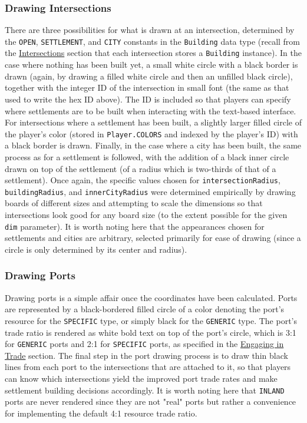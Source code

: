 \documentclass[pageno]{jpaper}
\begin{document}
\begin{doublespacing}
\hypertarget{sec:drawing_intersections}{}
\subsubsection{Drawing Intersections}

There are three possibilities for what is drawn at an intersection, determined by the \lstinline$OPEN$, \lstinline$SETTLEMENT$, and \lstinline$CITY$ constants in the \lstinline$Building$ data type (recall from the \hyperlink{sec:intersections}{Intersections} section that each intersection stores a \lstinline$Building$ instance). In the case where nothing has been built yet, a small white circle with a black border is drawn (again, by drawing a filled white circle and then an unfilled black circle), together with the integer ID of the intersection in small font (the same as that used to write the hex ID above). The ID is included so that players can specify where settlements are to be built when interacting with the text-based interface. For intersections where a settlement has been built, a slightly larger filled circle of the player's color (stored in \lstinline$Player.COLORS$ and indexed by the player's ID) with a black border is drawn. Finally, in the case where a city has been built, the same process as for a settlement is followed, with the addition of a black inner circle drawn on top of the settlement (of a radius which is two-thirds of that of a settlement). Once again, the specific values chosen for \lstinline$intersectionRadius$, \lstinline$buildingRadius$, and \lstinline$innerCityRadius$ were determined empirically by drawing boards of different sizes and attempting to scale the dimensions so that intersections look good for any board size (to the extent possible for the given \lstinline$dim$ parameter). It is worth noting here that the appearances chosen for settlements and cities are arbitrary, selected primarily for ease of drawing (since a circle is only determined by its center and radius).

\hypertarget{sec:drawing_ports}{}
\subsubsection{Drawing Ports}

Drawing ports is a simple affair once the coordinates have been calculated. Ports are represented by a black-bordered filled circle of a color denoting the port's resource for the \lstinline$SPECIFIC$ type, or simply black for the \lstinline$GENERIC$ type. The port's trade ratio is rendered as white bold text on top of the port's circle, which is 3:1 for \lstinline$GENERIC$ ports and 2:1 for \lstinline$SPECIFIC$ ports, as specified in the \hyperlink{sec:engaging_in_trade}{Engaging in Trade} section. The final step in the port drawing process is to draw thin black lines from each port to the intersections that are attached to it, so that players can know which intersections yield the improved port trade rates and make settlement building decisions accordingly. It is worth noting here that \lstinline$INLAND$ ports are never rendered since they are not "real" ports but rather a convenience for implementing the default 4:1 resource trade ratio.


\end{doublespacing}
\end{document}
